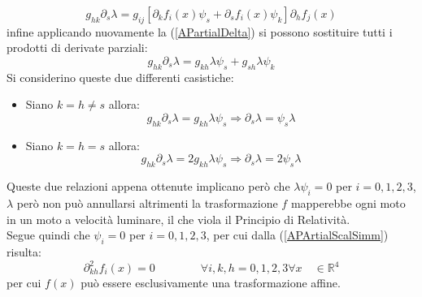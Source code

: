 \begin{equation}
    g_{hk} \partial_s\lambda =g_{ij} \left[\partial_kf_i(x)\psi_s+\partial_sf_i(x)\psi_k\right]\partial_hf_j(x)
\end{equation}    
infine applicando nuovamente la (\ref{APartialDelta}) si possono sostituire tutti i prodotti di derivate parziali:
\begin{equation*}
    g_{hk} \partial_s\lambda =g_{kh}\lambda\psi_s+g_{sh}\lambda \psi_k
\end{equation*}
Si considerino queste due differenti casistiche:
\begin{itemize}
    \item Siano $k=h\neq s$ allora:
    \begin{equation*}
        g_{hk} \partial_s\lambda =g_{kh}\lambda\psi_s \Rightarrow \partial_s\lambda=\psi_s\lambda
    \end{equation*}
    \item Siano $k=h= s$ allora:
    \begin{equation*}
        g_{hk} \partial_s\lambda =2g_{kh}\lambda\psi_s \Rightarrow \partial_s\lambda=2\psi_s\lambda
    \end{equation*}
\end{itemize}
Queste due relazioni appena ottenute implicano però che $\lambda\psi_i=0$ per $i=0,1,2,3$, $\lambda$ però non può annullarsi altrimenti la trasformazione $f$ mapperebbe ogni moto in un moto a velocità luminare, il che viola il Principio di Relatività.\\Segue quindi che $\psi_i=0$ per $i=0,1,2,3$, per cui dalla (\ref{APArtialScalSimm}) risulta:
\begin{equation}
    \partial_{kh}^2f_i(x)=0 \qquad \qquad \forall i,k,h=0,1,2,3 \forall x \quad\in \mathbb{R}^4
\end{equation}
per cui $f(x)$ può essere esclusivamente una trasformazione affine.